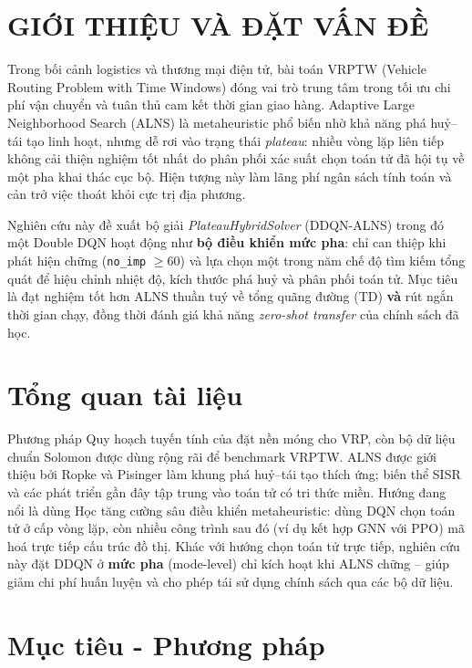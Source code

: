 \documentclass[13pt, a4paper]{extarticle} %
\begin{document}
\section*{GIỚI THIỆU VÀ ĐẶT VẤN ĐỀ}
Trong bối cảnh logistics và thương mại điện tử, bài toán VRPTW (Vehicle Routing Problem with Time Windows) đóng vai trò trung tâm trong tối ưu chi phí vận chuyển và tuân thủ cam kết thời gian giao hàng. Adaptive Large Neighborhood Search (ALNS) là metaheuristic phổ biến nhờ khả năng phá huỷ--tái tạo linh hoạt, nhưng dễ rơi vào trạng thái \textit{plateau}: nhiều vòng lặp liên tiếp không cải thiện nghiệm tốt nhất do phân phối xác suất chọn toán tử đã hội tụ về một pha khai thác cục bộ. Hiện tượng này làm lãng phí ngân sách tính toán và cản trở việc thoát khỏi cực trị địa phương.

Nghiên cứu này đề xuất bộ giải \textit{PlateauHybridSolver} (DDQN-ALNS) trong đó một Double DQN hoạt động như \textbf{bộ điều khiển mức pha}: chỉ can thiệp khi phát hiện chững (\texttt{no\_imp} $\ge 60$) và lựa chọn một trong năm chế độ tìm kiếm tổng quát để hiệu chỉnh nhiệt độ, kích thước phá huỷ và phân phối toán tử. Mục tiêu là đạt nghiệm tốt hơn ALNS thuần tuý về tổng quãng đường (TD) \textbf{và} rút ngắn thời gian chạy, đồng thời đánh giá khả năng \textit{zero-shot transfer} của chính sách đã học.

\newpage

\section{Tổng quan tài liệu}
Phương pháp Quy hoạch tuyến tính của \citep{Dantzig1959} đặt nền móng cho VRP, còn bộ dữ liệu chuẩn Solomon \citep{Solomon1987} được dùng rộng rãi để benchmark VRPTW. ALNS được giới thiệu bởi Ropke và Pisinger làm khung phá huỷ--tái tạo thích ứng; biến thể SISR và các phát triển gần đây tập trung vào toán tử có tri thức miền. Hướng đang nổi là dùng Học tăng cường sâu điều khiển metaheuristic: \citep{Chen2020Hybrid} dùng DQN chọn toán tử ở cấp vòng lặp, còn nhiều công trình sau đó (ví dụ kết hợp GNN với PPO) mã hoá trực tiếp cấu trúc đồ thị. Khác với hướng chọn toán tử trực tiếp, nghiên cứu này đặt DDQN ở \textbf{mức pha} (mode-level) chỉ kích hoạt khi ALNS chững -- giúp giảm chi phí huấn luyện và cho phép tái sử dụng chính sách qua các bộ dữ liệu.

\section{Mục tiêu - Phương pháp}
\end{document}
